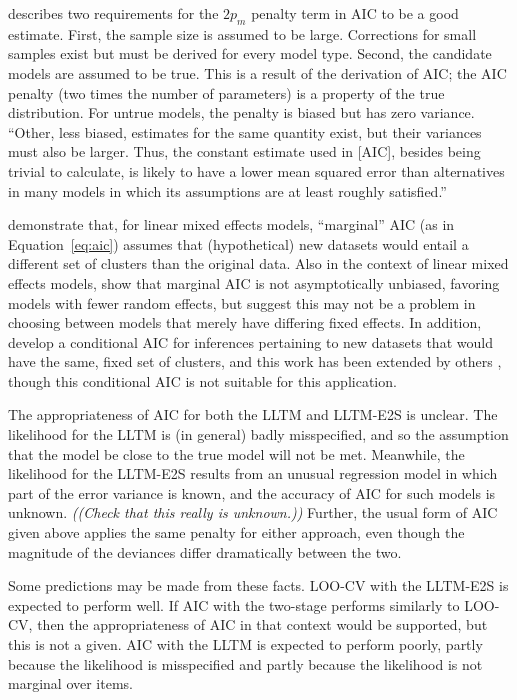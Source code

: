 \textcite{Kuha2004} describes two requirements for the $2p_m$ penalty term in AIC to be a good estimate. First, the sample size is assumed to be large. Corrections for small samples exist but must be derived for every model type. Second, the candidate models are assumed to be true. This is a result of the derivation of AIC; the AIC penalty (two times the number of parameters) is a property of the true distribution. For untrue models, the penalty is biased but has zero variance. ``Other, less biased, estimates for the same quantity exist, but their variances must also be larger. Thus, the constant estimate used in [AIC], besides being trivial to calculate, is likely to have a lower mean squared error than alternatives in many models in which its assumptions are at least roughly satisfied.''

\textcite{Vaida2005} demonstrate that, for linear mixed effects models, ``marginal'' AIC (as in Equation~\ref{eq:aic}) assumes that (hypothetical) new datasets would entail a different set of clusters than the original data. Also in the context of linear mixed effects models, \textcite{Greven2010} show that marginal AIC is not asymptotically unbiased, favoring models with fewer random effects, but suggest this may not be a problem in choosing between models that merely have differing fixed effects. In addition, \textcite{Vaida2005} develop a conditional AIC for inferences pertaining to new datasets that would have the same, fixed set of clusters, and this work has been extended by others \parencite{Liang2008, Greven2010, yu2012conditional, yu2013information, saefken2014unifying}, though this conditional AIC is not suitable for this application.

The appropriateness of AIC for both the LLTM and LLTM-E2S is unclear. The likelihood for the LLTM is (in general) badly misspecified, and so the assumption that the model be close to the true model will not be met. Meanwhile, the likelihood for the LLTM-E2S results from an unusual regression model in which part of the error variance is known, and the accuracy of AIC for such models is unknown. \emph{((Check that this really is unknown.))} Further, the usual form of AIC given above applies the same penalty for either approach, even though the magnitude of the deviances differ dramatically between the two.

Some predictions may be made from these facts. LOO-CV with the LLTM-E2S is expected to perform well. If AIC with the two-stage performs similarly to LOO-CV, then the appropriateness of AIC in that context would be supported, but this is not a given. AIC with the LLTM is expected to perform poorly, partly because the likelihood is misspecified and partly because the likelihood is not marginal over items.

